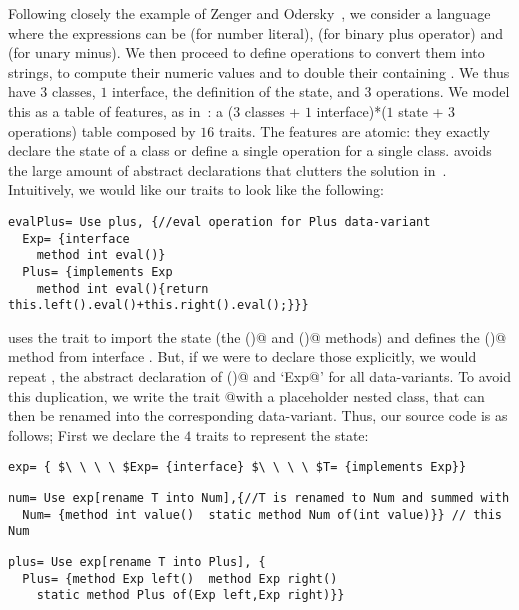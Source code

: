 Following closely
the example of Zenger and Odersky~\cite{Zenger-Odersky2005},
we consider a language where the
expressions \Q@Exp@ can
be \Q@Num@ (for number literal),
\Q@Plus@ (for binary plus operator)
and \Q@Neg@ (for unary minus).
We then proceed to define operations
\Q@show@ to convert them into strings,
 \Q@eval@ to compute their numeric values and 
\Q@double@ to double their containing \Q@Num@s.
We thus have $3$ classes, $1$ interface,
the definition of the state, and $3$ operations.
We model this
as a table of features, as in~\cite{deep}:
a ($3$ classes + $1$ interface)*($1$ state + $3$ operations)
table composed by $16$ traits.
The features are atomic: they exactly 
declare the state of a class
or define a single operation for a single class.
\name avoids the large amount of abstract declarations
that clutters the solution in~\cite{deep}.
Intuitively, we would like our traits to look like the following:
\begin{lstlisting}
evalPlus= Use plus, {//eval operation for Plus data-variant
  Exp= {interface
    method int eval()}
  Plus= {implements Exp
    method int eval(){return this.left().eval()+this.right().eval();}}}
\end{lstlisting}
\Q@evalPlus@ uses the trait \Q@plus@ to import the state (the \Q@left()@ and \Q@right()@ methods)
and defines the \Q@eval()@ method from interface \Q@Exp@.
But, if we were to declare those
explicitly, we would repeat \Q@Exp@, the abstract
declaration of \Q@eval()@ and `\Q@implements Exp@'
for all data-variants.
To avoid this duplication,  we write 
the trait \Q@eval @with a placeholder \Q@T@ nested class, that can then be renamed
into the corresponding data-variant.
Thus, our source code is as follows;
First we declare the $4$ traits to represent the state:
\newcommand\multiCode{\vspace{-5pt}}
\begin{lstlisting}
exp= { $\ \ \ \ $Exp= {interface} $\ \ \ \ $T= {implements Exp}}
\end{lstlisting}
\multiCode
\begin{lstlisting}
num= Use exp[rename T into Num],{//T is renamed to Num and summed with
  Num= {method int value()  static method Num of(int value)}} // this Num
\end{lstlisting}
\multiCode
\begin{lstlisting}
plus= Use exp[rename T into Plus], {
  Plus= {method Exp left()  method Exp right()
    static method Plus of(Exp left,Exp right)}}
\end{lstlisting}
\multiCode
